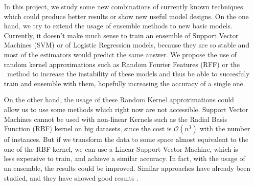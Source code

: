 \begin{pre-delivery}
  In this project, we study some new combinations of currently known techniques which
  could produce better results or show new useful model designs. On the one
  hand, we try to extend the usage of ensemble methods to new basic models.
  Currently, it doesn't make much sense to train an ensemble of Support Vector
  Machines (SVM) or of Logistic Regression models, because they are so stable and
  most of the estimators would predict the same answer. We propose the use of
  random kernel approximations such as Random Fourier Features\cite{rahimi2008random} (RFF) or the
  \Nys\ method\cite{NIPS2000_1866} to increase the instability of these models and thus be able to
  succesfuly train and ensemble with them, hopefully increasing the accuracy
  of a single one.

  On the other hand, the usage of these Random Kernel approximations could
  allow us to use some methods which right now are not accessible. Support
  Vector Machines cannot be used with non-linear Kernels such as the Radial
  Basis Function (RBF) kernel on big datasets, since the cost is
  $\mathcal{O}(n^3)$
  with the number of instances.
  But if
  we transform the data to some space almost equivalent to the one of the
  RBF kernel, we can use a Linear Support Vector Machine, which is less
  expensive to train, and achieve a similar accuracy. In fact, with the usage
  of an ensemble, the results could be improved. Similar approaches have
  already been studied, and they have showed good results \cite{svm_rff}
  \cite{Zhang2017StackedKN} \cite{rahimi2008random}.


\end{pre-delivery}
